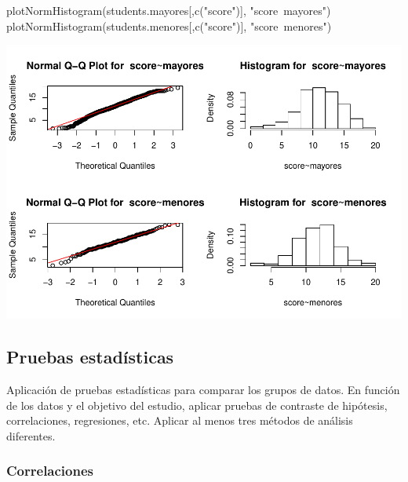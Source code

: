 \documentclass[]{article}
\newenvironment{Shaded}{\begin{snugshade}}{\end{snugshade}}
\newcommand{\KeywordTok}[1]{\textcolor[rgb]{0.94,0.87,0.69}{#1}}
\newcommand{\NormalTok}[1]{\textcolor[rgb]{0.80,0.80,0.80}{#1}}
\newcommand{\StringTok}[1]{\textcolor[rgb]{0.80,0.58,0.58}{#1}}
\begin{document}
\begin{Shaded}
\begin{Highlighting}[]
\KeywordTok{plotNormHistogram}\NormalTok{(students.mayores[,}\KeywordTok{c}\NormalTok{(}\StringTok{"score"}\NormalTok{)], }\StringTok{"score~mayores"}\NormalTok{)}
\KeywordTok{plotNormHistogram}\NormalTok{(students.menores[,}\KeywordTok{c}\NormalTok{(}\StringTok{"score"}\NormalTok{)], }\StringTok{"score~menores"}\NormalTok{)}
\end{Highlighting}
\end{Shaded}

\includegraphics{Practica2_files/figure-latex/unnamed-chunk-42-3.pdf}

\hypertarget{pruebas-estadisticas}{%
\subsection{Pruebas estadísticas}\label{pruebas-estadisticas}}

Aplicación de pruebas estadísticas para comparar los grupos de datos. En
función de los datos y el objetivo del estudio, aplicar pruebas de
contraste de hipótesis, correlaciones, regresiones, etc. Aplicar al
menos tres métodos de análisis diferentes.

\hypertarget{correlaciones}{%
\subsubsection{Correlaciones}\label{correlaciones}}
\end{document}
